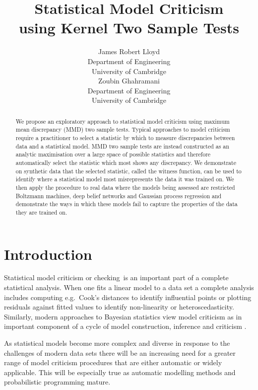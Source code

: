 \documentclass{article} %
\title{Statistical Model Criticism\\using Kernel Two Sample Tests}
\author{
James Robert Lloyd\\
Department of Engineering\\
University of Cambridge\\
\And
Zoubin Ghahramani\\
Department of Engineering\\
University of Cambridge\\
}
\def\eg{e.g.\ }
\begin{document}
 

\maketitle

\vspace{-\baselineskip}

\begin{abstract} 
We propose an exploratory approach to statistical model criticism using maximum mean discrepancy (MMD) two sample tests.
Typical approaches to model criticism require a practitioner to select a statistic by which to measure discrepancies between data and a statistical model.
MMD two sample tests are instead constructed as an analytic maximisation over a large space of possible statistics and therefore automatically select the statistic which most shows any discrepancy.
We demonstrate on synthetic data that the selected statistic, called the witness function, can be used to identify where a statistical model most misrepresents the data it was trained on.
We then apply the procedure to real data where the models being assessed are restricted Boltzmann machines, deep belief networks and Gaussian process regression and demonstrate the ways in which these models fail to capture the properties of the data they are trained on.
\end{abstract} 

\allowdisplaybreaks

\vspace{-\baselineskip}

\section{Introduction}

Statistical model criticism or checking\footnotemark~is an important part of a complete statistical analysis.
When one fits a linear model to a data set a complete analysis includes computing \eg Cook's distances \cite{Cook1982-eq} to identify influential points or plotting residuals against fitted values to identify non-linearity or heteroscedasticity.
Similarly, modern approaches to Bayesian statistics view model criticism as in important component of a cycle of model construction, inference and criticism \citep{Gelman2013-st}.

As statistical models become more complex and diverse in response to the challenges of modern data sets there will be an increasing need for a greater range of model criticism procedures that are either automatic or widely applicable.
This will be especially true as automatic modelling methods \citep[e.g.][]{Grosse2012-zi, Thornton2013-zg, Lloyd2014-nz} and probabilistic programming \citep[e.g.][]{Koller1997-am, Milch2005-qc, Goodman2008-ok, Stan_Development_Team2014-ha} mature.
\end{document}
